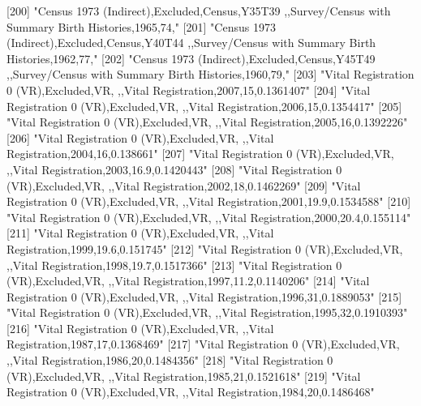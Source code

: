 [200] "Census 1973 (Indirect),Excluded,Census,Y35T39 ,,Survey/Census with Summary Birth Histories,1965,74,"                          
[201] "Census 1973 (Indirect),Excluded,Census,Y40T44 ,,Survey/Census with Summary Birth Histories,1962,77,"                          
[202] "Census 1973 (Indirect),Excluded,Census,Y45T49 ,,Survey/Census with Summary Birth Histories,1960,79,"                          
[203] "Vital Registration 0 (VR),Excluded,VR, ,,Vital Registration,2007,15,0.1361407"                                                
[204] "Vital Registration 0 (VR),Excluded,VR, ,,Vital Registration,2006,15,0.1354417"                                                
[205] "Vital Registration 0 (VR),Excluded,VR, ,,Vital Registration,2005,16,0.1392226"                                                
[206] "Vital Registration 0 (VR),Excluded,VR, ,,Vital Registration,2004,16,0.138661"                                                 
[207] "Vital Registration 0 (VR),Excluded,VR, ,,Vital Registration,2003,16.9,0.1420443"                                              
[208] "Vital Registration 0 (VR),Excluded,VR, ,,Vital Registration,2002,18,0.1462269"                                                
[209] "Vital Registration 0 (VR),Excluded,VR, ,,Vital Registration,2001,19.9,0.1534588"                                              
[210] "Vital Registration 0 (VR),Excluded,VR, ,,Vital Registration,2000,20.4,0.155114"                                               
[211] "Vital Registration 0 (VR),Excluded,VR, ,,Vital Registration,1999,19.6,0.151745"                                               
[212] "Vital Registration 0 (VR),Excluded,VR, ,,Vital Registration,1998,19.7,0.1517366"                                              
[213] "Vital Registration 0 (VR),Excluded,VR, ,,Vital Registration,1997,11.2,0.1140206"                                              
[214] "Vital Registration 0 (VR),Excluded,VR, ,,Vital Registration,1996,31,0.1889053"                                                
[215] "Vital Registration 0 (VR),Excluded,VR, ,,Vital Registration,1995,32,0.1910393"                                                
[216] "Vital Registration 0 (VR),Excluded,VR, ,,Vital Registration,1987,17,0.1368469"                                                
[217] "Vital Registration 0 (VR),Excluded,VR, ,,Vital Registration,1986,20,0.1484356"                                                
[218] "Vital Registration 0 (VR),Excluded,VR, ,,Vital Registration,1985,21,0.1521618"                                                
[219] "Vital Registration 0 (VR),Excluded,VR, ,,Vital Registration,1984,20,0.1486468"                                                
